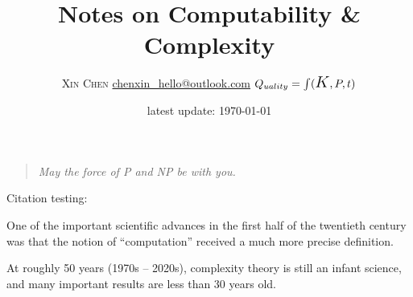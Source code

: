 \documentclass[12pt]{article} %
\title{Notes on Computability \& Complexity}
\author{\textsc{Xin Chen} \qquad \href{mailto:chenxin_hello@outlook.com}{\textsf{chenxin\_hello@outlook.com}}  
	\qquad 
	$Q_{uality} = \int (\text{\Large $K$},P,t)$}
\date{latest update: \today}
\begin{document}
\maketitle

\begin{quotation}
	\itshape May the force of \textsf{P} and \textsf{NP} be with you. 	
\end{quotation}


\tableofcontents


\medskip

Citation testing: \cite{Aro.Bar2009}

\vspace{2em}

One of the important scientific advances in the first half of the twentieth century was that the notion of ``computation'' received a much more precise definition.


At roughly 50 years (1970s -- 2020s), 
complexity theory is still an infant science, 
and many important results are less than 30 years old.








\clearpage
\printbibliography
{}
\end{document}
